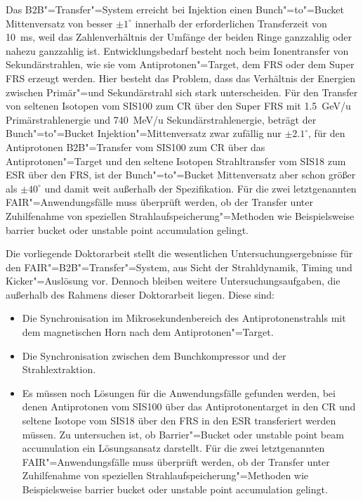 Das B2B"=Transfer"=System erreicht bei Injektion einen Bunch"=to"=Bucket Mittenversatz von besser $\pm1^\circ$ innerhalb der erforderlichen Transferzeit von \SI{10}{\ms}, weil das Zahlenverh\"altnis der Umf\"ange der beiden Ringe ganzzahlig oder nahezu ganzzahlig ist. Entwicklungsbedarf besteht noch beim Ionentransfer von Sekund\"arstrahlen, wie sie vom Antiprotonen"=Target, dem FRS oder dem Super FRS erzeugt werden. Hier besteht das Problem, dass das Verh\"altnis der Energien zwischen Prim\"ar"=und
Sekund\"arstrahl sich stark unterscheiden. F\"ur den Transfer von seltenen Isotopen vom SIS100 zum CR \"uber den Super FRS mit \SI{1.5}{GeV/u} Prim\"arstrahlenergie und \SI{740}{MeV/u} Sekund\"arstrahlenergie, betr\"agt der Bunch"=to"=Bucket Injektion"=Mittenversatz zwar zufällig nur $\pm2.1^\circ$, f\"ur den Antiprotonen B2B"=Transfer vom SIS100 zum CR \"uber das Antiprotonen"=Target und den seltene Isotopen Strahltransfer vom SIS18 zum ESR \"uber den FRS, ist der Bunch"=to"=Bucket Mittenversatz aber schon gr\"o\ss{}er als $\pm40^\circ$ und damit weit au\ss{}erhalb der Spezifikation. F\"ur die zwei letztgenannten FAIR"=Anwendungsf\"alle muss \"uberpr\"uft werden, ob der Transfer unter Zuhilfenahme von speziellen Strahlaufspeicherung"=Methoden wie Beispielsweise barrier bucket oder unstable point accumulation gelingt.



Die vorliegende Doktorarbeit stellt die wesentlichen Untersuchungsergebnisse f\"ur den FAIR"=B2B"=Transfer"=System, aus Sicht der Strahldynamik, Timing und Kicker"=Ausl\"osung vor. Dennoch bleiben weitere Untersuchungsaufgaben, die au\ss{}erhalb des Rahmens dieser Doktorarbeit liegen. Diese sind:
\begin{itemize}

\item Die Synchronisation im Mikrosekundenbereich des Antiprotonenstrahls mit dem magnetischen Horn nach dem Antiprotonen"=Target.
\item Die Synchronisation zwischen dem Bunchkompressor und der Strahlextraktion.
\item Es m\"ussen noch L\"osungen f\"ur die Anwendungsf\"alle gefunden werden, bei denen Antiprotonen vom SIS100 \"uber das Antiprotonentarget in den CR und seltene Isotope vom SIS18 \"uber den FRS in den ESR transferiert werden m\"ussen. Zu untersuchen ist, ob Barrier"=Bucket oder unstable point beam accumulation ein L\"osungsansatz darstellt. F\"ur die zwei letztgenannten FAIR"=Anwendungsf\"alle muss \"uberpr\"uft werden, ob der Transfer unter Zuhilfenahme von speziellen Strahlaufspeicherung"=Methoden wie Beispielsweise barrier bucket oder unstable point accumulation gelingt.
\end{itemize}

